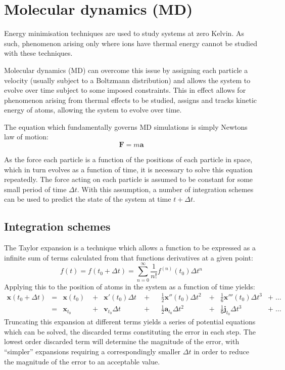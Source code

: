 \section{Molecular dynamics (MD)}
\label{sec:MD}
Energy minimisation techniques are used to study systems at zero Kelvin.
As such, phenomenon arising only where ions have thermal energy cannot be studied with these techniques.

Molecular dynamics (MD) can overcome this issue by assigning each particle a velocity (usually subject to a Boltzmann distribution) and allows the system to evolve over time subject to some imposed constraints.
This in effect allows for phenomenon arising from thermal effects to be studied,
assigns and tracks kinetic energy of atoms, allowing the system to evolve over time.

The equation which fundamentally governs MD simulations is simply Newtons law of motion:
\begin{equation}
	\mathbf{F} = m\mathbf{a}
\end{equation}

As the force each particle is a function of the positions of each particle in space, which in turn evolves as a function of time, it is necessary to solve this equation repeatedly.
The force acting on each particle is assumed to be constant for some small period of time $\Delta t$.
With this assumption, a number of integration schemes can be used to predict the state of the system at time $t +\Delta t$.
\newpage
\subsection{Integration schemes}
The Taylor expansion is a technique which allows a function to be expressed as a infinite sum of terms calculated from that functions derivatives at a given point:
\begin{equation}
f(t) = f(t_0 + \Delta t) = \sum_{n=0}^\infty \frac{1}{n!}f^{(n)}(t_0)\Delta t^n
\end{equation}
Applying this to the position of atoms in the system as a function of time yields:
\begin{align}
\mathbf{x}(t_0 + \Delta t) &= &\mathbf{x}(t_0) \; &+ &\mathbf{x}'(t_0)\Delta t \;&+& &\frac{1}{2}\mathbf{x}''(t_0)\Delta t^2 \;&+& \frac{1}{6}\mathbf{x}'''(t_0)\Delta t^3& +\;\dots\\
                           &= &\mathbf{x}_{t_0} \; &+  &\mathbf{v}_{t_0}\Delta t \;&+&   &\frac{1}{2}\mathbf{a}_{t_0}\Delta t^2     \;&+& \frac{1}{6}\mathbf{j}_{t_0}\Delta t^3& +\;\dots
\end{align}
Truncating this expansion at different terms yields a series of potential equations which can be solved, the discarded terms constituting the error in each step.
The lowest order discarded term will determine the magnitude of the error, with ``simpler'' expansions requiring a correspondingly smaller $\Delta t$ in order to reduce the magnitude of the error to an acceptable value.

